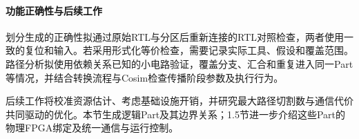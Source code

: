 
\paragraph{功能正确性与后续工作}

划分生成的正确性拟通过原始RTL与分区后重新连接的RTL对照检查，两者使用一致的复位和输入。若采用形式化等价检查，需要记录实际工具、假设和覆盖范围。路径分析拟使用依赖关系已知的小电路验证，覆盖分支、汇合和重复进入同一Part等情况，并结合转换流程与Cosim检查传播阶段参数及执行行为。


后续工作将校准资源估计、考虑基础设施开销，并研究最大路径切割数与通信代价共同驱动的优化。本节生成逻辑Part及其边界关系；1.5节进一步介绍这些Part的物理FPGA绑定及统一通信与运行控制。
